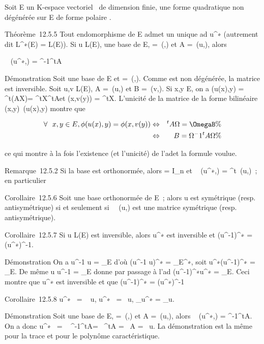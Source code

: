 \documentclass[]{article}
\begin{document}
Soit E un K-espace vectoriel ~de dimension finie, \Phi une forme
quadratique non dégénérée sur E de forme polaire \phi.

Théorème~12.5.5 Tout endomorphisme de E admet un unique ad\jmathoint
u^∗ (autrement dit L^∗(E) = L(E)). Si u \in L(E), 
une base de E, \Omega =\
\mathrmMat (\phi,) et A =\
\mathrmMat (u,), alors

\mathrmMat~
(u^∗,) = \Omega^-1^tA\Omega

Démonstration Soit \mathcal{E} une base de E et \Omega =\
\mathrmMat (\phi,). Comme \phi est non dégénérée, la
matrice \Omega est inversible. Soit u,v \in L(E), A =\
\mathrmMat (u,) et B =\
\mathrmMat (v,). Si x,y \in E, on a \phi(u(x),y) =
^t(AX)\OmegaY = ^tX^tA\OmegaY et \phi(x,v(y)) =
^tX\OmegaBY . L'unicité de la matrice de la forme bilinéaire
(x,y)\mapsto~\phi(u(x),y) montre que

\begin{align*} \forall~~x,y \in E,
\phi(u(x),y) = \phi(x,v(y))& \Leftrightarrow & ^tA\Omega
= \OmegaB \%& \\ &
\Leftrightarrow & B = \Omega^-1^tA\Omega\%&
\\ \end{align*}

ce qui montre à la fois l'existence (et l'unicité) de l'ad\jmathoint et la
formule voulue.

Remarque~12.5.2 Si la base  est orthonormée, alors \Omega = I\_n et
\mathrmMat~
(u^∗,) = ^t\
\mathrmMat (u,)~; en particulier

Corollaire~12.5.6 Soit \mathcal{E} une base orthonormée de E~; alors u est
symétrique (resp. antisymétrique) si et seulement
si~\mathrmMat~ (u,\mathcal{E}) est une
matrice symétrique (resp. antisymétrique).

Corollaire~12.5.7 Si u \in L(E) est inversible, alors u^∗ est
inversible et (u^-1)^∗ =
(u^∗)^-1.

Démonstration On a u^-1 \cdot u =
\mathrmId\_E d'où (u^-1 \cdot
u)^∗ = \mathrmId\_E^∗, soit
u^∗\cdot (u^-1)^∗ =
\mathrmId\_E. De même u \cdot u^-1 =
\mathrmId\_E donne par passage à l'ad\jmathoint
(u^-1)^∗\cdot u^∗ =
\mathrmId\_E. Ceci montre que u^∗
est inversible et que (u^-1)^∗ =
(u^∗)^-1

Corollaire~12.5.8
\mathrm{det} u^∗~
= ~ u,
u^∗~
= \mathrm{tr}~u,
\chi\_u^∗ = \chi\_u.

Démonstration Soit  une base de E, \Omega =\
\mathrmMat (\phi,) et A =\
\mathrmMat (u,), alors
\mathrmMat~
(u^∗,\mathcal{E}) = \Omega^-1^tA\Omega. On a donc
\mathrm{det} u^∗~
= \mathrm{det}~
\Omega^-1^tA\Omega =\
 ^tA =\
 A =\
 u. La démonstration est la même pour la
trace et pour le polynôme caractéristique.
\end{document}
